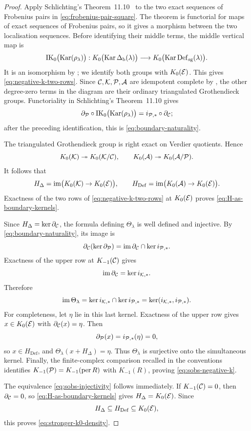 \begin{proof}
Apply Schlichting's Theorem~11.10~\cite{Schlichting06} to the two exact sequences of Frobenius pairs in \eqref{eq:frobenius-pair-square}.  The theorem is functorial for maps of exact sequences of Frobenius pairs, so it gives a morphism between the two localisation sequences.  Before identifying their middle terms, the middle vertical map is
\[
 \mathrm{IK}_0\bigl(\operatorname{Kar}(\rho_\lambda)\bigr):
 K_0\bigl(\operatorname{Kar}\Delta_{\mathrm b}(\lambda)\bigr)
 \longrightarrow
 K_0\bigl(\operatorname{Kar}\operatorname{Def}_{\mathrm{sg}}(\lambda)\bigr).
\]
It is an isomorphism by ; we identify both groups with \(K_0(\mathcal E)\).  This gives \eqref{eq:negative-k-two-rows}.  Since \(\mathcal C,\mathcal K,\mathcal P,\mathcal A\) are idempotent complete by , the other degree-zero terms in the diagram are their ordinary triangulated Grothendieck groups.  Functoriality in Schlichting's Theorem~11.10 gives
\[
 \partial_{\mathcal P}\circ
 \mathrm{IK}_0\bigl(\operatorname{Kar}(\rho_\lambda)\bigr)
 =i_{\mathcal P,*}\circ\partial_{\mathcal C};
\]
after the preceding identification, this is \eqref{eq:boundary-naturality}.

The triangulated Grothendieck group is right exact on Verdier quotients.  Hence
\[
 K_0(\mathcal K)\twoheadrightarrow K_0(\mathcal K/\mathcal C),
 \qquad
 K_0(\mathcal A)\twoheadrightarrow K_0(\mathcal A/\mathcal P).
\]
It follows that
\[
 H_\Delta=\operatorname{im}\bigl(K_0(\mathcal K)\to K_0(\mathcal E)\bigr),
 \qquad
 H_{\mathrm{Def}}=\operatorname{im}\bigl(K_0(\mathcal A)\to K_0(\mathcal E)\bigr).
\]
Exactness of the two rows of \eqref{eq:negative-k-two-rows} at \(K_0(\mathcal E)\) proves \eqref{eq:H-as-boundary-kernels}.

Since \(H_\Delta=\ker\partial_{\mathcal C}\), the formula defining \(\Theta_\lambda\) is well defined and injective.  By \eqref{eq:boundary-naturality}, its image is
\[
 \partial_{\mathcal C}(\ker\partial_{\mathcal P})
 =\operatorname{im}\partial_{\mathcal C}\cap\ker i_{\mathcal P,*}.
\]
Exactness of the upper row at \(K_{-1}(\mathcal C)\) gives
\[
 \operatorname{im}\partial_{\mathcal C}=\ker i_{\mathcal K,*}.
\]
Therefore
\[
 \operatorname{im}\Theta_\lambda
 =\ker i_{\mathcal K,*}\cap\ker i_{\mathcal P,*}
 =\ker(i_{\mathcal K,*},i_{\mathcal P,*}).
\]
For completeness, let \(\eta\) lie in this last kernel.  Exactness of the upper row gives \(x\in K_0(\mathcal E)\) with \(\partial_{\mathcal C}(x)=\eta\).  Then
\[
 \partial_{\mathcal P}(x)=i_{\mathcal P,*}(\eta)=0,
\]
so \(x\in H_{\mathrm{Def}}\), and \(\Theta_\lambda(x+H_\Delta)=\eta\).  Thus \(\Theta_\lambda\) is surjective onto the simultaneous kernel.  Finally, the finite-complex comparison recalled in the conventions identifies \(K_{-1}(\mathcal P)=K_{-1}(\operatorname{per} R)\) with \(K_{-1}(R)\), proving \eqref{eq:sobs-negative-k}.

The equivalence \eqref{eq:sobs-injectivity} follows immediately.  If \(K_{-1}(\mathcal C)=0\), then \(\partial_{\mathcal C}=0\), so \eqref{eq:H-as-boundary-kernels} gives \(H_\Delta=K_0(\mathcal E)\).  Since
\[
 H_\Delta\subseteq H_{\mathrm{Def}}\subseteq K_0(\mathcal E),
\]
this proves \eqref{eq:stronger-k0-density}.
\end{proof}


